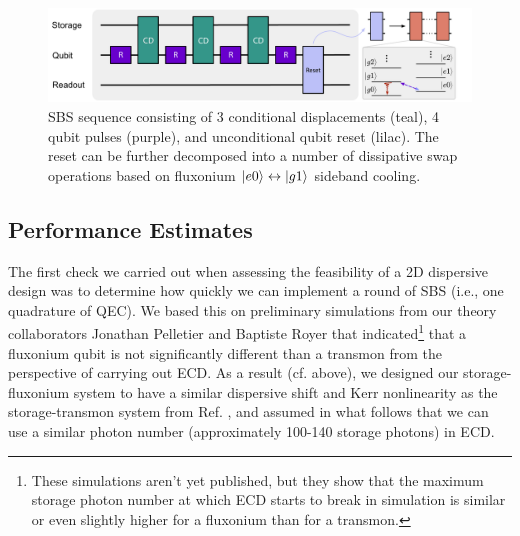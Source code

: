 \begin{figure}[h]
    \centering
 \includegraphics[width=\linewidth]{Figures/5/SBS_Sideband_Reset.pdf}
    \caption[SBS error correction sequence and proposed unconditional reset scheme.]{SBS sequence consisting of 3 conditional displacements (teal), 4 qubit pulses (purple),  and unconditional qubit reset (lilac). The reset can be further decomposed into a number of dissipative swap operations based on fluxonium $\lvert e0\rangle\leftrightarrow\lvert g1\rangle$ sideband cooling.}
    \label{fig:5_SBS_Sideband_Reset}
\end{figure}

\clearpage
\subsection{Performance Estimates}

The first check we carried out when assessing the feasibility of a 2D dispersive design was to determine how quickly we can implement a round of SBS (i.e., one quadrature of QEC). We based this on preliminary simulations from our theory collaborators Jonathan Pelletier and Baptiste Royer that indicated\footnote{These simulations aren't yet published, but they show that the maximum storage photon number at which ECD starts to break in simulation is similar or even slightly higher for a fluxonium than for a transmon.} that a fluxonium qubit is not significantly different than a transmon from the perspective of carrying out ECD. As a result (cf. above), we designed our storage-fluxonium system to have a similar dispersive shift and Kerr nonlinearity as the storage-transmon system from Ref. \cite{sivak2023gkp-expt}, and assumed in what follows that we can use a similar photon number (approximately 100-140 storage photons) in ECD. 

